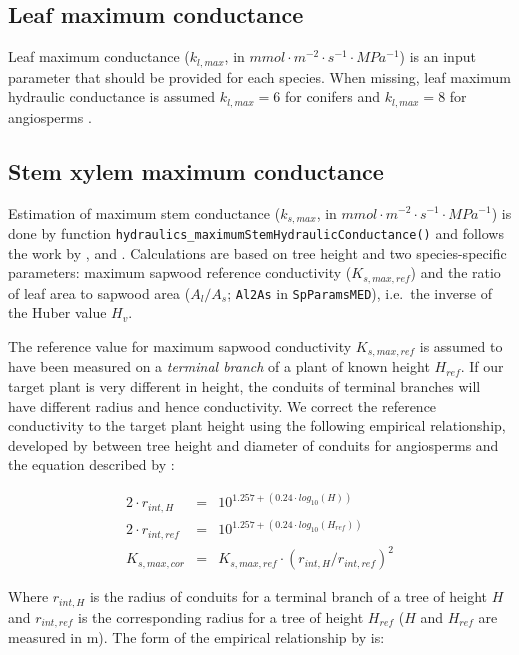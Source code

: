 \documentclass[]{book}
\begin{document}
\subsection{Leaf maximum conductance}\label{leaf-maximum-conductance}

Leaf maximum conductance (\(k_{l, max}\), in
\(mmol \cdot m^{-2} \cdot s^{-1} \cdot MPa^{-1}\)) is an input parameter
that should be provided for each species. When missing, leaf maximum
hydraulic conductance is assumed \(k_{l, max}=6\) for conifers and
\(k_{l, max}=8\) for angiosperms \citep{Sack2006}.

\subsection{Stem xylem maximum
conductance}\label{stem-xylem-maximum-conductance}

Estimation of maximum stem conductance (\(k_{s,max}\), in
\(mmol \cdot m^{-2} \cdot s^{-1} \cdot MPa^{-1}\)) is done by function
\texttt{hydraulics\_maximumStemHydraulicConductance()} and follows the
work by \citet{Savage2010}, \citet{Olson2014} and
\citet{Christoffersen2016}. Calculations are based on tree height and
two species-specific parameters: maximum sapwood reference conductivity
(\(K_{s,max,ref}\)) and the ratio of leaf area to sapwood area
(\(A_{l}/A_{s}\); \texttt{Al2As} in \texttt{SpParamsMED}), i.e.~the
inverse of the Huber value \(H_v\).

The reference value for maximum sapwood conductivity \(K_{s,max,ref}\)
is assumed to have been measured on a \emph{terminal branch} of a plant
of known height \(H_{ref}\). If our target plant is very different in
height, the conduits of terminal branches will have different radius and
hence conductivity. We correct the reference conductivity to the target
plant height using the following empirical relationship, developed by
\citet{Olson2014} between tree height and diameter of conduits for
angiosperms and the equation described by \citet{Christoffersen2016}:

\begin{eqnarray}
2 \cdot r_{int,H}&=& 10^{1.257+(0.24\cdot log_{10}(H))} \\
2 \cdot r_{int,ref}&=&10^{1.257+(0.24\cdot log_{10}(H_{ref}))}\\
K_{s,max,cor}&=&K_{s,max,ref}\cdot (r_{int,H}/r_{int,ref})^{2}
\end{eqnarray}

Where \(r_{int,H}\) is the radius of conduits for a terminal branch of a
tree of height \(H\) and \(r_{int,ref}\) is the corresponding radius for
a tree of height \(H_{ref}\) (\(H\) and \(H_{ref}\) are measured in m).
The form of the empirical relationship by \citet{Olson2014} is:
\end{document}
